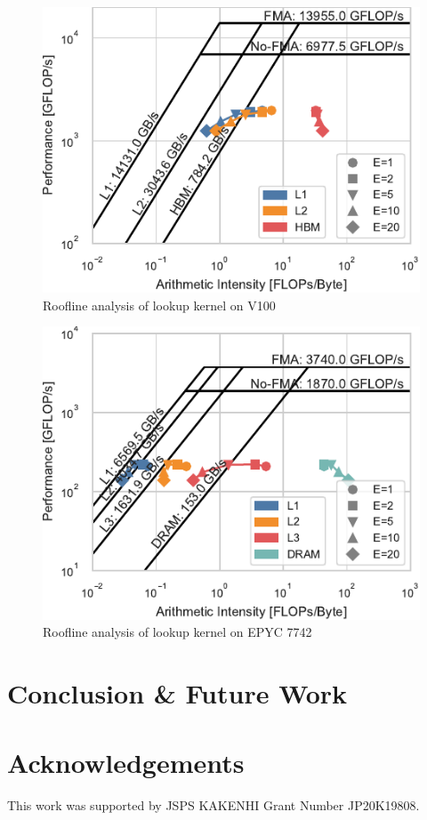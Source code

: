 \documentclass[conference]{IEEEtran}
\begin{document}
\begin{figure}
    \centering
    \includegraphics{figs/roofline_lookup_v100}
    \caption{Roofline analysis of lookup kernel on V100}%
    \label{fig:architecture}
\end{figure}

\begin{figure}
    \centering
    \includegraphics{figs/roofline_lookup_epyc}
    \caption{Roofline analysis of lookup kernel on EPYC 7742}%
    \label{fig:architecture}
\end{figure}

\section{Conclusion \& Future Work}

\section*{Acknowledgements}
This work was supported by JSPS KAKENHI Grant Number JP20K19808.



\end{document}
